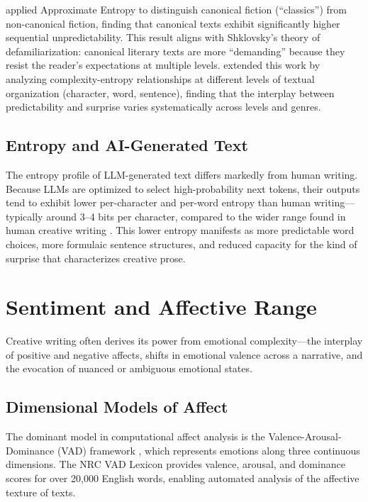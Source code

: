 \documentclass[12pt,a4paper]{article}
\begin{document}
\citet{febres2022approximate} applied Approximate Entropy to distinguish canonical fiction (``classics'') from non-canonical fiction, finding that canonical texts exhibit significantly higher sequential unpredictability. This result aligns with Shklovsky's theory of defamiliarization: canonical literary texts are more ``demanding'' because they resist the reader's expectations at multiple levels. \citet{rosso2019complexity} extended this work by analyzing complexity-entropy relationships at different levels of textual organization (character, word, sentence), finding that the interplay between predictability and surprise varies systematically across levels and genres.

\subsection{Entropy and AI-Generated Text}

The entropy profile of LLM-generated text differs markedly from human writing. Because LLMs are optimized to select high-probability next tokens, their outputs tend to exhibit lower per-character and per-word entropy than human writing---typically around 3--4 bits per character, compared to the wider range found in human creative writing \citep{tang2024survey}. This lower entropy manifests as more predictable word choices, more formulaic sentence structures, and reduced capacity for the kind of surprise that characterizes creative prose.

\section{Sentiment and Affective Range}

Creative writing often derives its power from emotional complexity---the interplay of positive and negative affects, shifts in emotional valence across a narrative, and the evocation of nuanced or ambiguous emotional states.

\subsection{Dimensional Models of Affect}

The dominant model in computational affect analysis is the Valence-Arousal-Dominance (VAD) framework \citep{russell1980circumplex}, which represents emotions along three continuous dimensions. The NRC VAD Lexicon \citep{mohammad2018nrc} provides valence, arousal, and dominance scores for over 20,000 English words, enabling automated analysis of the affective texture of texts.
\end{document}
